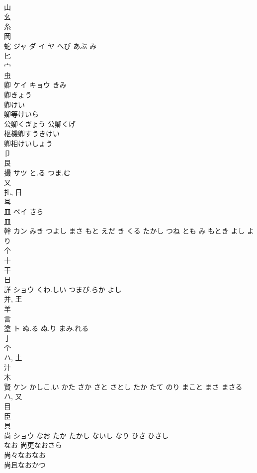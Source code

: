 \documentclass[8pt]{extreport}
\begin{document}
\begin{CJK}{UTF8}{min}
\\	山 
\\	幺 
\\	糸 
\\	岡 
\\	蛇	ジャ ダ イ ヤ	へび あぶ み	
\\	匕 
\\	宀 
\\	虫 
\\	卿	ケイ キョウ	きみ	
\\	卿きょう 
\\	卿けい 
\\	卿等けいら 
\\	公卿くぎょう 公卿くげ 
\\	枢機卿すうきけい 
\\	卿相けいしょう 
\\	卩 
\\	艮 
\\	撮	サツ	と.る つま.む	
\\	又 
\\	扎, 日 
\\	耳 
\\	皿	ベイ	さら	
\\	皿 
\\	幹	カン	みき つよし まさ もと えだ き くる たかし つね とも み もとき よし より	
\\	个 
\\	十 
\\	干 
\\	日 
\\	詳	ショウ	くわ.しい つまび.らか よし	
\\	并, 王 
\\	羊 
\\	言 
\\	塗	ト	ぬ.る ぬ.り まみ.れる	
\\	亅 
\\	个 
\\	ハ, 土 
\\	汁 
\\	木 
\\	賢	ケン	かしこ.い かた さか さと さとし たか たて のり まこと まさ まさる	
\\	ハ, 又 
\\	目 
\\	臣 
\\	貝 
\\	尚	ショウ	なお たか たかし ないし なり ひさ ひさし	
\\	なお 尚更なおさら 
\\	尚々なおなお 
\\	尚且なおかつ 

\end{CJK}
\end{document}
